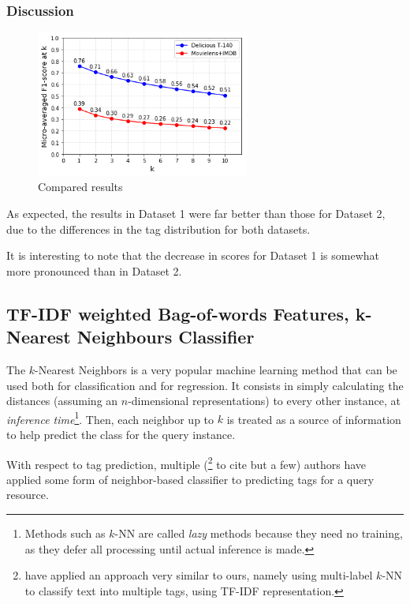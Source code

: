 \subsubsection{Discussion}

\begin{figure}[H]
    \centering
    \includegraphics[width=7cm]{chapters/05_experiments/images/proposal-1-compared-ovr-svm-bow.png}
    \caption{Compared results}
    \label{fig:compared_ovr_svm}
\end{figure}

As expected, the results in Dataset 1 were far better than those for Dataset 2, due to the differences in the tag distribution for both datasets.

It is interesting to note that the decrease in scores for Dataset 1 is somewhat more pronounced than in Dataset 2.

\subsection{TF-IDF weighted Bag-of-words Features, k-Nearest Neighbours Classifier}

The $k$-Nearest Neighbors is a very popular machine learning method that can be used both for classification and for regression. It consists in simply calculating the distances (assuming an $n$-dimensional representations) to every other instance, at \textit{inference time}\footnote{Methods such as $k$-NN are called \textit{lazy} methods because they need no training, as they defer all processing until actual inference is made.}. Then, each neighbor up to $k$ is treated as a source of information to help predict the class for the query instance. 

With respect to tag prediction, multiple (\cite{martinez_etal_2009,chidlovskii_2012,zhang_etal_2015,charte_etal_2015}\footnote{\cite{charte_etal_2015} have applied an approach very similar to ours, namely using multi-label $k$-NN to classify text into multiple tags, using TF-IDF representation. } to cite but a few) authors have applied some form of neighbor-based classifier to predicting tags for a query resource. 

